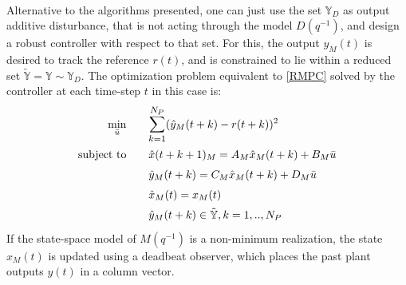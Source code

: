 \documentclass[letterpaper, 10 pt, conference]{ieeeconf}  %
\newcommand{\AB}[1]{\textbf{\color{magenta}{[AB: #1]}}}
\begin{document}
\\
\indent
Alternative to the algorithms presented, one can just use the set $\mathbb{Y}_D$ as output additive disturbance, that is not acting through the model $D(q^{-1})$, and design a robust controller with respect to that set.  For this, the output $y_M(t)$ is desired to track the reference $r(t)$, and is constrained to lie within a reduced set $\tilde{\mathbb{Y}}=\mathbb{Y} \sim \mathbb{Y}_D$. The optimization problem equivalent to \eqref{RMPC} solved by the controller at each time-step $t$ in this case is:
\begin{equation}
\small
\begin{aligned}
\underset{\bar{u}}{\text{min}}
&  \hspace{20pt} \mathlarger{\sum\limits_{k=1}^{N_P}}(\hat y_M(t+k)-r(t+k))^2 \\
\text{subject to}
& \hspace{20pt} \hat{x}(t+k+1)_M = A_M\hat{x}_M(t+k) + B_M\bar{u}\\
& \hspace{20pt} \hat y_M(t+k) = C_M\hat{x}_M(t+k) + D_M\bar{u} \\
& \hspace{20pt} \hat{x}_M(t)=x_M(t) \\
& \hspace{20pt} \hat{y}_M(t+k)\in \tilde{\mathbb{Y}},k=1,..,N_P
\end{aligned}
\label{RMPC_output}
\end{equation}
If the state-space model of $M(q^{-1})$ is a non-minimum realization,
the state $x_M(t)$ is updated using a deadbeat observer, which places the past plant outputs $y(t)$ in a column vector.
\end{document}
